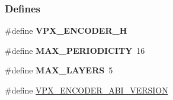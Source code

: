 \subsubsection*{\-Defines}
\begin{DoxyCompactItemize}
\item 
\hypertarget{group__encoder_gad1f3154e8dfc7058a43a4a8d3c94b8fd}{
\#define {\bfseries \-V\-P\-X\-\_\-\-E\-N\-C\-O\-D\-E\-R\-\_\-\-H}}
\label{group__encoder_gad1f3154e8dfc7058a43a4a8d3c94b8fd}

\item 
\hypertarget{group__encoder_gae6569d89cc61cb190aeeb00a1b40ad88}{
\#define {\bfseries \-M\-A\-X\-\_\-\-P\-E\-R\-I\-O\-D\-I\-C\-I\-T\-Y}~16}
\label{group__encoder_gae6569d89cc61cb190aeeb00a1b40ad88}

\item 
\hypertarget{group__encoder_gade9d4b2ac5f29fe89ffea40e7c58c9d6}{
\#define {\bfseries \-M\-A\-X\-\_\-\-L\-A\-Y\-E\-R\-S}~5}
\label{group__encoder_gade9d4b2ac5f29fe89ffea40e7c58c9d6}

\item 
\hypertarget{group__encoder_gaa4f0b52293c08ba672429c3a03648b9d}{
\#define \hyperlink{group__encoder_gaa4f0b52293c08ba672429c3a03648b9d}{\-V\-P\-X\-\_\-\-E\-N\-C\-O\-D\-E\-R\-\_\-\-A\-B\-I\-\_\-\-V\-E\-R\-S\-I\-O\-N}}
\label{group__encoder_gaa4f0b52293c08ba672429c3a03648b9d}


\end{DoxyCompactItemize}
